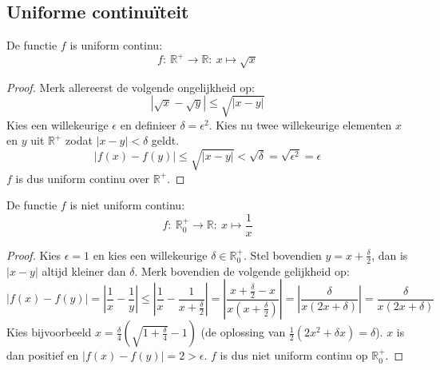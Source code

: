 \documentclass[main.tex]{subfiles}
\begin{document}
\subsection{Uniforme continu\"iteit}
\label{sec:unif-cont}


\begin{vb}
  De functie $f$ is uniform continu:
  \[ f:\ \mathbb{R}^{+} \rightarrow \mathbb{R}:\ x \mapsto \sqrt{x} \]

  \begin{proof}
    Merk allereerst de volgende ongelijkheid op:
    \[ |\sqrt{x} - \sqrt{y}| \le \sqrt{|x-y|} \]
    Kies een willekeurige $\epsilon$ en definieer $\delta = \epsilon^{2}$.
    Kies nu twee willekeurige elementen $x$ en $y$ uit $\mathbb{R}^{+}$ zodat $|x-y|< \delta$ geldt.
    \[ |f(x) - f(y)| \le  \sqrt{|x-y|} < \sqrt{\delta} = \sqrt{\epsilon^{2}} = \epsilon \]
    $f$ is dus uniform continu over $\mathbb{R}^{+}$.
  \end{proof}
\end{vb}

\begin{tvb}
  De functie $f$ is niet uniform continu:
  \[ f:\ \mathbb{R}_{0}^{+} \rightarrow \mathbb{R}:\ x \mapsto \frac{1}{x} \]

  \begin{proof}
    Kies $\epsilon = 1$ en kies een willekeurige $\delta \in \mathbb{R}_{0}^{+}$.
    Stel bovendien $y = x + \frac{\delta}{2}$, dan is $|x-y|$ altijd kleiner dan $\delta$.
    Merk bovendien de volgende gelijkheid op:
    \[ |f(x)-f(y)| = \left| \frac{1}{x} - \frac{1}{y} \right| \le \left| \frac{1}{x} - \frac{1}{x + \frac{\delta}{2}} \right| = \left| \frac{x+\frac{\delta}{2}-x}{x(x+\frac{\delta}{2})}\right| = \left| \frac{\delta}{x(2x+\delta)} \right| = \frac{\delta}{x(2x+\delta)} \]
    Kies bijvoorbeeld $x = \frac{\delta}{4}\left(\sqrt{1+\frac{\delta}{4}}-1\right)$ (de oplossing van $\frac{1}{2}(2x^{2}+\delta x) = \delta$).
    $x$ is dan positief en $|f(x)-f(y)| = 2 > \epsilon$.
    $f$ is dus niet uniform continu op $\mathbb{R}_{0}^{+}$.
  \end{proof}
\end{tvb}

\end{document}
